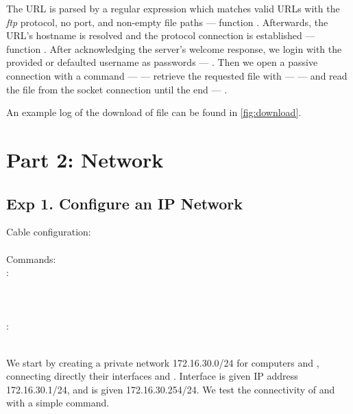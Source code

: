 \documentclass[compilation.tex]{subfiles}
\begin{document}
The URL is parsed by a regular expression which matches valid URLs with the \textsl{ftp} protocol, no port, and non-empty file paths --- function . Afterwards, the URL's hostname is resolved and the protocol connection is established --- function . After acknowledging the server's welcome response, we login with the provided or defaulted username as passwords --- . Then we open a passive connection with a  command ---  --- retrieve the requested file with  ---  --- and read the file from the socket connection until the end --- .

An example log of the download of file  can be found in \autoref{fig:download}.

\section{Part 2: Network}
\label{sec:network}

\subsection[Configure an IP Network]{Exp 1. Configure an IP Network}
\label{subsec:exp1}

\begin{cables}{7}{0.40}
	Cable configuration:\\
	\\
	
	Commands:\\
	:\\
	\\
	\\
	\\
	:\\
	\\
\end{cables}

We start by creating a private network 172.16.30.0/24 for computers  and , connecting directly their interfaces  and . Interface  is given IP address 172.16.30.1/24, and  is given 172.16.30.254/24.
We test the connectivity of  and  with a simple  command.
\end{document}
